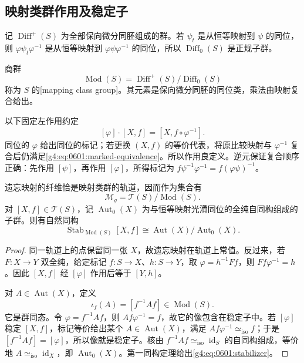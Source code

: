 \subsection{映射类群作用及稳定子}
\label{g4:subsec:0601:03}

记 \(\operatorname{Diff}^+(S)\) 为全部保向微分同胚组成的群。若 \(\psi_t\) 是从恒等映射到 \(\psi\) 的同位，则 \(\varphi\psi_t\varphi^{-1}\) 是从恒等映射到 \(\varphi\psi\varphi^{-1}\) 的同位，所以 \(\operatorname{Diff}_0(S)\) 是正规子群。

\begin{definition}\label{g4:def:0601:mapping-class-group}
	商群
	\[
		\operatorname{Mod}(S)=
		\operatorname{Diff}^+(S)/\operatorname{Diff}_0(S)
	\]
	称为 \(S\) 的[mapping class group]。其元素是保向微分同胚的同位类，乘法由映射复合给出。
\end{definition}

以下固定左作用约定
\begin{equation}\label{g4:eq:0601:mcg-action}
	[\varphi]\cdot[X,f]=[X,f\circ\varphi^{-1}].
\end{equation}
同位的 \(\varphi\) 给出同位的标记；若更换 \((X,f)\) 的等价代表，将原比较映射与 \(\varphi^{-1}\) 复合后仍满足\eqref{g4:eq:0601:marked-equivalence}。所以作用良定义。逆元保证复合顺序正确：先作用 \([\psi]\)，再作用 \([\varphi]\)，所得标记为 \(f\psi^{-1}\varphi^{-1}=f(\varphi\psi)^{-1}\)。

\begin{proposition}\label{g4:prop:0601:moduli-quotient}
	遗忘映射的纤维恰是映射类群的轨道，因而作为集合有
	\[
		\mathcal M_g=\mathcal T(S)/\operatorname{Mod}(S).
	\]
	对 \([X,f]\in\mathcal T(S)\)，记 \(\operatorname{Aut}_0(X)\) 为与恒等映射光滑同位的全纯自同构组成的子群。则有自然同构
	\begin{equation}\label{g4:eq:0601:stabilizer}
		\operatorname{Stab}_{\operatorname{Mod}(S)}[X,f]
		\cong\operatorname{Aut}(X)/\operatorname{Aut}_0(X).
	\end{equation}
\end{proposition}
\begin{proof}
	同一轨道上的点保留同一张 \(X\)，故遗忘映射在轨道上常值。反过来，若 \(F:X\to Y\) 双全纯，给定标记 \(f:S\to X\)、\(h:S\to Y\)，取 \(\varphi=h^{-1}Ff\)，则 \(Ff\varphi^{-1}=h\)。因此 \([X,f]\) 经 \([\varphi]\) 作用后等于 \([Y,h]\)。

	对 \(A\in\operatorname{Aut}(X)\)，定义
	\[
		\iota_f(A)=[f^{-1}Af]\in\operatorname{Mod}(S).
	\]
	它是群同态。令 \(\varphi=f^{-1}Af\)，则 \(Af\varphi^{-1}=f\)，故它的像包含在稳定子中。若 \([\varphi]\) 稳定 \([X,f]\)，标记等价给出某个 \(A\in\operatorname{Aut}(X)\)，满足 \(Af\varphi^{-1}\simeq_{\mathrm{iso}}f\)；于是 \([f^{-1}Af]=[\varphi]\)，所以像就是稳定子。核由 \(f^{-1}Af\simeq_{\mathrm{iso}}\operatorname{id}_S\) 的自同构组成，等价地 \(A\simeq_{\mathrm{iso}}\operatorname{id}_X\)，即 \(\operatorname{Aut}_0(X)\)。第一同构定理给出\eqref{g4:eq:0601:stabilizer}。
\end{proof}

